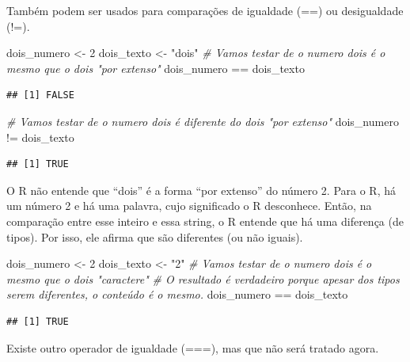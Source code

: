 \documentclass[
]{book}
\newenvironment{Shaded}{\begin{snugshade}}{\end{snugshade}}
\newcommand{\CommentTok}[1]{\textcolor[rgb]{0.56,0.35,0.01}{\textit{#1}}}
\newcommand{\DecValTok}[1]{\textcolor[rgb]{0.00,0.00,0.81}{#1}}
\newcommand{\NormalTok}[1]{#1}
\newcommand{\OtherTok}[1]{\textcolor[rgb]{0.56,0.35,0.01}{#1}}
\newcommand{\SpecialCharTok}[1]{\textcolor[rgb]{0.00,0.00,0.00}{#1}}
\newcommand{\StringTok}[1]{\textcolor[rgb]{0.31,0.60,0.02}{#1}}
\begin{document}
Também podem ser usados para comparações de igualdade (==) ou desigualdade (!=).

\begin{Shaded}
\begin{Highlighting}[]
\NormalTok{dois\_numero }\OtherTok{\textless{}{-}} \DecValTok{2}
\NormalTok{dois\_texto }\OtherTok{\textless{}{-}} \StringTok{"dois"}
\CommentTok{\# Vamos testar de o numero dois é o mesmo que o dois "por extenso"}
\NormalTok{dois\_numero }\SpecialCharTok{==}\NormalTok{ dois\_texto}
\end{Highlighting}
\end{Shaded}

\begin{verbatim}
## [1] FALSE
\end{verbatim}

\begin{Shaded}
\begin{Highlighting}[]
\CommentTok{\# Vamos testar de o numero dois é diferente do dois "por extenso"}
\NormalTok{dois\_numero }\SpecialCharTok{!=}\NormalTok{ dois\_texto}
\end{Highlighting}
\end{Shaded}

\begin{verbatim}
## [1] TRUE
\end{verbatim}

O R não entende que ``dois'' é a forma ``por extenso'' do número 2. Para o R, há um número 2 e há uma palavra, cujo significado o R desconhece. Então, na comparação entre esse inteiro e essa string, o R entende que há uma diferença (de tipos). Por isso, ele afirma que são diferentes (ou não iguais).

\begin{Shaded}
\begin{Highlighting}[]
\NormalTok{dois\_numero }\OtherTok{\textless{}{-}} \DecValTok{2}
\NormalTok{dois\_texto }\OtherTok{\textless{}{-}} \StringTok{"2"}
\CommentTok{\# Vamos testar de o numero dois é o mesmo que o dois "caractere"}
\CommentTok{\# O resultado é verdadeiro porque apesar dos tipos serem diferentes, o conteúdo é o mesmo.}
\NormalTok{dois\_numero }\SpecialCharTok{==}\NormalTok{ dois\_texto}
\end{Highlighting}
\end{Shaded}

\begin{verbatim}
## [1] TRUE
\end{verbatim}

Existe outro operador de igualdade (===), mas que não será tratado agora.
\end{document}
